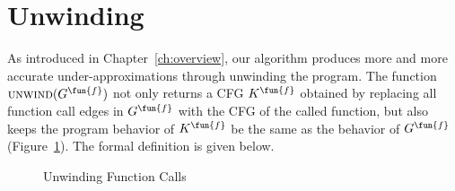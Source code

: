 
\section{Unwinding}\label{sec:unwinding}
As introduced in Chapter~\ref{ch:overview}, our algorithm produces more and more
accurate under-approximations through unwinding the program.
The function $\textsc{unwind}(G^\fun{f})$ not only returns a CFG $K^\fun{f}$
obtained by replacing all function call edges in $G^\fun{f}$ with the CFG of
the called function,
but also keeps the program behavior of $K^\fun{f}$ be the same as the behavior
of $G^\fun{f}$ (Figure~\ref{figure:unwinding}).
The formal definition is given below.

\begin{figure}[t]
  \centering

  \caption{Unwinding Function Calls}
  \label{figure:unwinding}
\end{figure}


